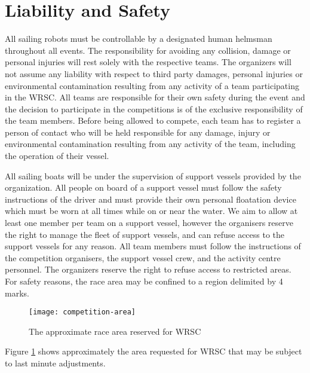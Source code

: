 \documentclass[12pt]{article}
\begin{document}
\section{Liability and Safety}
All sailing robots must be controllable by a designated human helmsman
throughout all events. The responsibility for avoiding any collision, 
damage or personal injuries will rest solely with the respective teams. 
The organizers will not assume any liability with respect to third party
damages, personal injuries or environmental contamination resulting from any
activity of a team participating in the WRSC. All teams are responsible for 
their own safety during the event and the decision to participate in the 
competitions is of the exclusive responsibility of the team members.
Before being allowed to compete, each team has to register a person of contact
who will be held responsible for any damage, injury or environmental
contamination resulting from any activity of the team, including the 
operation of their vessel.

All sailing boats will be under the supervision of support vessels provided by the
organization.
All people on board of a support vessel must follow the safety instructions of the driver 
and must provide their own personal floatation device which must be worn at all times 
while on or near the water. We aim to allow at least one member per team on a support vessel, 
however the organisers reserve the
right to manage the fleet of support vessels, and can refuse access to the support
vessels for any reason.
All team members must follow the instructions of the competition
organisers, the support vessel crew, and the activity centre personnel. The organizers
reserve the right to refuse access to restricted areas.
For safety reasons, the race area may be confined to a region delimited by 4
marks. 


  \begin{figure}[H]
    \centering
    \texttt{[image: competition-area]}
    \caption{The approximate race area reserved for WRSC}
    \label{fig:competitionarea}
  \end{figure}

  Figure \ref{fig:competitionarea} shows approximately the area requested for WRSC that may be subject to last
minute adjustments.
\end{document}
